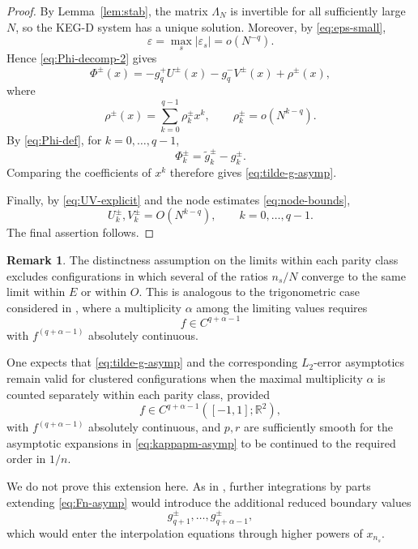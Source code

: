 \documentclass[11pt,a4paper]{article}
\theoremstyle{definition}
\newtheorem{remark}[theorem]{Remark}
\begin{document}
\begin{proof}
By Lemma~\ref{lem:stab}, the matrix $\Lambda_N$ is invertible for all
sufficiently large $N$, so the KEG-D system has a unique solution.
Moreover, by \eqref{eq:eps-small},
\[
\varepsilon=\max_s|\varepsilon_s|=o(N^{-q}).
\]
Hence \eqref{eq:Phi-decomp-2} gives
\[
\Phi^\pm(x)
=
-g_q^+U^\pm(x)-g_q^-V^\pm(x)+\rho^\pm(x),
\]
where
\[
\rho^\pm(x)
=
\sum_{k=0}^{q-1}\rho_k^\pm x^k,
\qquad
\rho_k^\pm=o(N^{k-q}).
\]
By \eqref{eq:Phi-def}, for $k=0,\dots,q-1$,
\[
\Phi_k^\pm
=
\widetilde g_k^\pm-g_k^\pm.
\]
Comparing the coefficients of $x^k$ therefore gives
\eqref{eq:tilde-g-asymp}.

Finally, by \eqref{eq:UV-explicit} and the node estimates
\eqref{eq:node-bounds},
\[
U_k^\pm,V_k^\pm=O(N^{k-q}),
\qquad
k=0,\dots,q-1.
\]
The final assertion follows.
\end{proof}
\begin{remark}\label{rem:mult}
The distinctness assumption on the limits within each parity class
excludes configurations in which several of the ratios $n_s/N$
converge to the same limit within $E$ or within $O$. This is analogous
to the trigonometric case considered in \cite{BBP}, where a
multiplicity $\alpha$ among the limiting values requires
\[
f\in C^{q+\alpha-1}
\]
with $f^{(q+\alpha-1)}$ absolutely continuous.

One expects that \eqref{eq:tilde-g-asymp} and the corresponding
$L_2$-error asymptotics remain valid for clustered configurations when
the maximal multiplicity $\alpha$ is counted separately within each
parity class, provided
\[
f\in C^{q+\alpha-1}([-1,1];\mathbb R^2),
\]
with $f^{(q+\alpha-1)}$ absolutely continuous, and $p,r$ are
sufficiently smooth for the asymptotic expansions in
\eqref{eq:kappapm-asymp} to be continued to the required order in
$1/n$.

We do not prove this extension here. As in
\cite[Theorem~3.3]{BBP}, further integrations by parts extending
\eqref{eq:Fn-asymp} would introduce the additional reduced boundary
values
\[
g_{q+1}^\pm,\dots,g_{q+\alpha-1}^\pm,
\]
which would enter the interpolation equations through higher powers of
$x_{n_s}$.
\end{remark}


\end{document}
